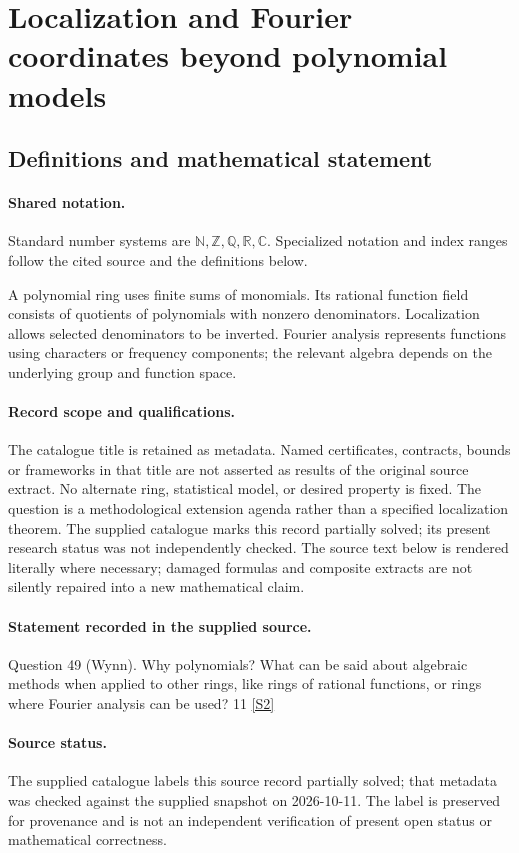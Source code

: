 \documentclass[11pt]{article}
\newcommand{\sref}[2]{\hyperlink{source:#1:#2}{[S#2]}}
\begin{document}
\section{Localization and Fourier coordinates beyond polynomial models}\label{statement}

\subsection{Definitions and mathematical statement}

\paragraph{Shared notation.}Standard number systems are $\mathbb N,\mathbb Z,\mathbb Q,\mathbb R,\mathbb C$. Specialized notation and index ranges follow the cited source and the definitions below.


A polynomial ring uses finite sums of monomials. Its rational function field consists of quotients of polynomials with nonzero denominators. Localization allows selected denominators to be inverted. Fourier analysis represents functions using characters or frequency components; the relevant algebra depends on the underlying group and function space.
\paragraph{Record scope and qualifications.}
The catalogue title is retained as metadata. Named certificates, contracts, bounds or frameworks in that title are not asserted as results of the original source extract.
No alternate ring, statistical model, or desired property is fixed. The question is a methodological extension agenda rather than a specified localization theorem. The supplied catalogue marks this record partially solved; its present research status was not independently checked.
The source text below is rendered literally where necessary; damaged formulas and composite extracts are not silently repaired into a new mathematical claim.
\paragraph{Statement recorded in the supplied source.}
Question 49 (Wynn). Why polynomials? What can be said about algebraic methods when applied to other rings, like rings of rational functions, or rings where Fourier analysis can be used? 11 \sref{statement}{2}
\paragraph{Source status.}
The supplied catalogue labels this source record partially solved; that metadata was checked against the supplied snapshot on 2026-10-11. The label is preserved for provenance and is not an independent verification of present open status or mathematical correctness.
\end{document}
